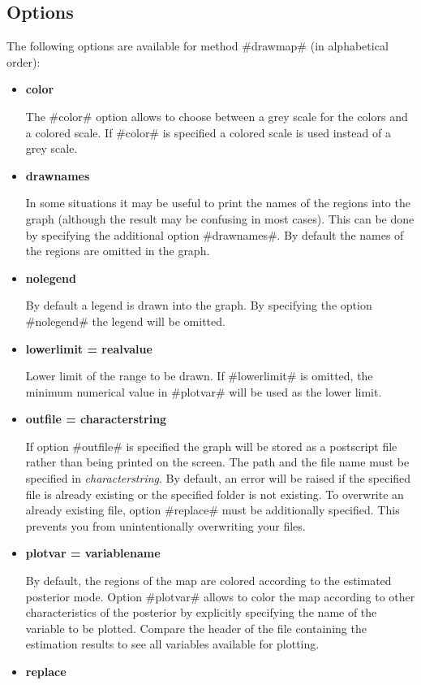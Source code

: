\subsection*{Options}

The following options are available for method #drawmap# (in
alphabetical order):

\begin{itemize}
\item {\bf color}

The #color# option allows to choose between a grey scale for the
colors and a colored scale. If #color# is specified a colored
scale is used instead of a grey scale. \item {\bf drawnames}

In some situations it may be useful to print the names of the
regions into the graph (although the result may be confusing in
most cases). This can be done by specifying the additional option
#drawnames#. By default the names of the regions are omitted in
the graph. \item {\bf nolegend}

By default a legend is drawn into the graph. By specifying the
option #nolegend# the legend will be omitted. \item {\bf
lowerlimit = realvalue}

Lower limit of the range to be drawn. If #lowerlimit# is omitted,
the minimum numerical value in #plotvar# will be used as the
lower limit. \item {\bf outfile = characterstring}

If option #outfile# is specified the graph will be stored as a
postscript file rather than being printed on the screen. The path
and the file name must be specified in {\em characterstring}. By
default, an error will be raised if the specified file  is already
existing or the specified folder is not existing. To overwrite  an
already existing file, option #replace# must be additionally
specified. This prevents you from unintentionally overwriting your
files.
\item {\bf plotvar = variablename}

By default, the regions of the map are colored according to the
estimated posterior mode. Option #plotvar# allows to color the map
according to other characteristics of the posterior by explicitly
specifying the name of the variable to be plotted. Compare the
header of the file containing the estimation results to see all
variables available for plotting. \item {\bf replace}


\end{itemize}
